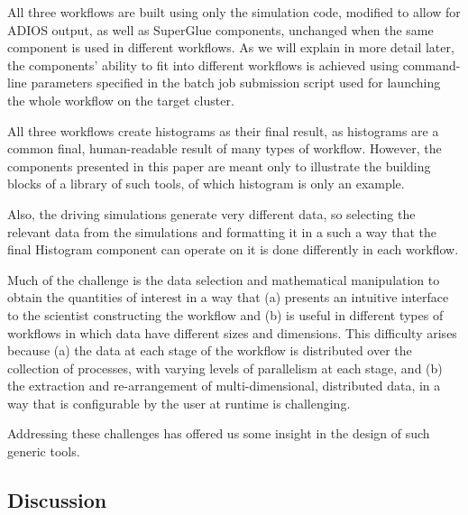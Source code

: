 All three workflows are built using only the simulation code,
modified to allow for ADIOS output, as well as SuperGlue
components, unchanged when the same component is used
in different workflows.
As we will explain in more detail later,
the components' ability to fit
into different workflows
is achieved using command-line
parameters specified in the batch job
submission script used for launching
the whole workflow on the target cluster.

All three workflows create histograms as their final
result, as histograms are a common final,
human-readable result of many types of workflow.
However, the components presented in this paper
are meant only to illustrate the building blocks
of a library of such tools, of which histogram is
only an example.

Also, the driving simulations generate very
different data, so selecting the
relevant data from the simulations and
formatting it in a such a way that the
final Histogram component can operate on
it is done differently in each
workflow.

Much of the challenge is the
data selection and mathematical
manipulation to obtain the quantities of
interest in a way that (a) presents an
intuitive interface to the scientist
constructing the workflow and (b) is
useful in different types of workflows
in which data have different sizes and
dimensions.  This difficulty arises
because (a) the data at each stage of the
workflow is distributed over the collection
of processes, with varying levels
of parallelism at each stage, and
(b) the extraction and
re-arrangement of multi-dimensional,
distributed data, in a way that is
configurable by the user at runtime is challenging. 

Addressing these challenges has offered us some insight
in the design of such generic tools.

\subsection{Discussion}

